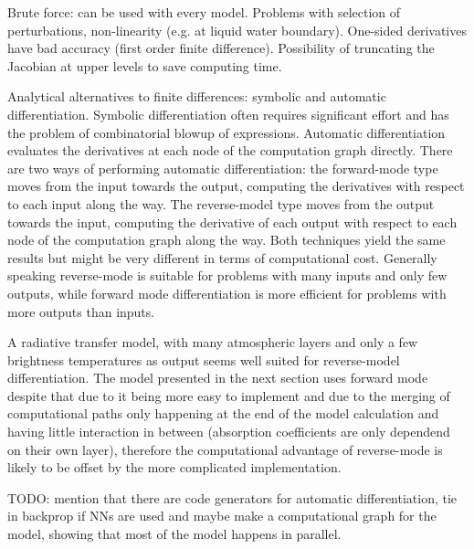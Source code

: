         Brute force: can be used with every model. Problems with selection of
        perturbations, non-linearity (e.g. at liquid water boundary). One-sided
        derivatives have bad accuracy (first order finite difference).
        Possibility of truncating the Jacobian at upper levels to save
        computing time.

        Analytical alternatives to finite differences: symbolic and automatic
        differentiation. Symbolic differentiation often requires significant
        effort and has the problem of combinatorial blowup of expressions.
        Automatic differentiation evaluates the derivatives at each node of
        the computation graph directly. There are two ways of performing
        automatic differentiation: the forward-mode type moves from the input
        towards the output, computing the derivatives with respect to each
        input along the way. The reverse-model type moves from the output
        towards the input, computing the derivative of each output with respect
        to each node of the computation graph along the way. Both techniques
        yield the same results but might be very different in terms of
        computational cost. Generally speaking reverse-mode is suitable for
        problems with many inputs and only few outputs, while forward mode
        differentiation is more efficient for problems with more outputs than
        inputs.

        A radiative transfer model, with many atmospheric layers and only
        a few brightness temperatures as output seems well suited for
        reverse-model differentiation. The model presented in the next section
        uses forward mode despite that due to it being more easy to implement
        and due to the merging of computational paths only happening at the end
        of the model calculation and having little interaction in between
        (absorption coefficients are only dependend on their own layer),
        therefore the computational advantage of reverse-mode is likely to be
        offset by the more complicated implementation.

        TODO: mention that there are code generators for automatic
        differentiation, tie in backprop if NNs are used and maybe make a
        computational graph for the model, showing that most of the model
        happens in parallel.

    \stopsubsection


\stopsection


\startsection[title={Characterization of Errors},reference={ch:rtm_errors}]

